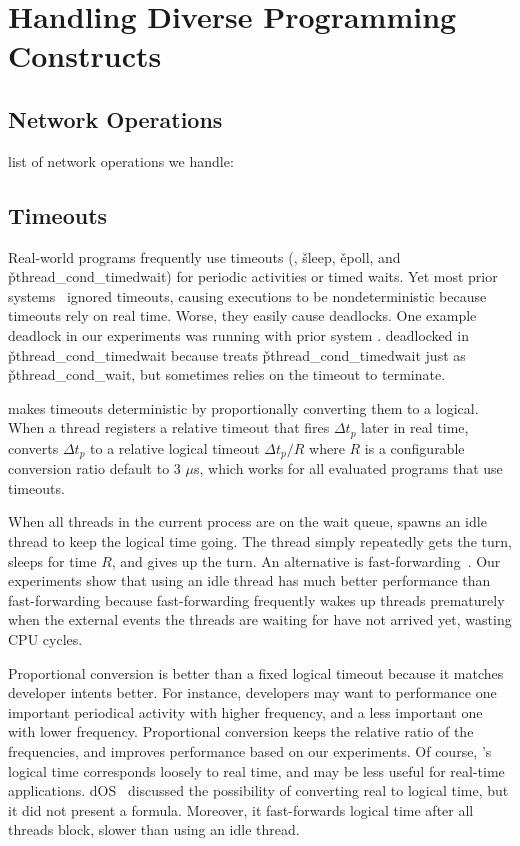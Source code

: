 \section{Handling Diverse Programming Constructs}

\subsection{Network Operations}

list of network operations we handle:

\subsection{Timeouts} \label{sec:timeout}

Real-world programs frequently use timeouts (\eg, \v{sleep}, \v{epoll},
and \v{pthread\_cond\_timedwait}) for periodic activities or timed waits.
Yet most prior systems~\cite{xxx} ignored timeouts, causing executions to
be nondeterministic because timeouts rely on real time.  Worse, they
easily cause deadlocks.  One example deadlock in our experiments was
running \pbzip with prior system \dthreads.  \pbzip deadlocked in
\v{pthread\_cond\_timedwait} because \dthreads treats
\v{pthread\_cond\_timedwait} just as \v{pthread\_cond\_wait}, but \pbzip
sometimes relies on the timeout to terminate.

\xxx makes timeouts deterministic by proportionally converting them to a
logical.  When a thread registers a relative timeout that fires $\Delta
t_p$ later in real time, \xxx converts $\Delta t_p$ to a relative logical
timeout $\Delta t_p /R$ where $R$ is a configurable conversion ratio
default to 3 $\mu$s, which works for all evaluated programs that use
timeouts.

When all threads in the current process are on the wait queue, \xxx spawns
an idle thread to keep the logical time going. The thread simply
repeatedly gets the turn, sleeps for time $R$, and gives up the turn.  An
alternative is fast-forwarding~\cite{modist:nsdi09}.  Our experiments show
that using an idle thread has much better performance than fast-forwarding
because fast-forwarding frequently wakes up threads prematurely when the
external events the threads are waiting for have not arrived yet, wasting
CPU cycles.

Proportional conversion is better than a fixed logical timeout because it
matches developer intents better.  For instance, developers may want to
performance one important periodical activity with higher frequency, and a
less important one with lower frequency.  Proportional conversion keeps
the relative ratio of the frequencies, and improves performance based on
our experiments.  Of course, \xxx's logical time corresponds loosely to
real time, and may be less useful for real-time applications.
dOS~\cite{dos:osdi10} discussed the possibility of converting real to
logical time, but it did not present a formula.  Moreover, it
fast-forwards logical time after all threads block, slower than using an
idle thread.


